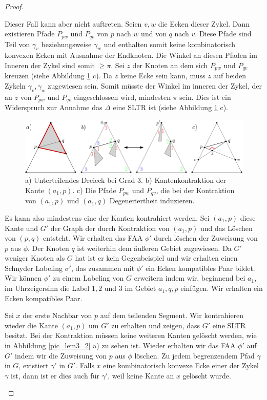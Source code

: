 \begin{proof}
\begin{description}[leftmargin =0pt, font = \bfseries]
Dieser Fall kann aber nicht auftreten. Seien $v,w$ die Ecken dieser Zykel. Dann existieren Pfade $P_{pw}$ und $P_{qv}$ von $p$ nach $w$ und von $q$ nach $v$. Diese Pfade sind Teil von $\gamma_v$ beziehungsweise $\gamma_w$ und enthalten somit keine kombinatorisch konvexen Ecken mit Ausnahme der Endknoten. Die Winkel an diesen Pfaden im Inneren der Zykel sind somit $\geq \pi$. Sei $z$ der Knoten an dem sich $P_{pw}$ und $P_{qv}$ kreuzen (siehe Abbildung \ref{pic_lem3_1} c). Da $z$ keine Ecke sein kann, muss $z$ auf beiden Zykeln $\gamma_v,\gamma_w$  zugewiesen sein. Somit müsste der Winkel im inneren der Zykel, der an $z$ von $P_{pw}$ und $P_{qv}$ eingeschlossen wird, mindesten $\pi$ sein. Dies ist ein Widerspruch zur Annahme das $\Delta$ eine SLTR ist (siehe Abbildung \ref{pic_lem3_1} c).

\begin{figure}[h]
	\centering
	  \includegraphics[width=1\textwidth]{lem3_1.png}
    	\caption{a) Unterteilendes Dreieck bei Grad 3. b) Kantenkontraktion der Kante $(a_1,p)$. c) Die Pfade $P_{pw}$ und $P_{qv}$, die bei der Kontraktion von $(a_1,p)$ und $(a_1,q)$ Degeneriertheit induzieren.}
    	\label{pic_lem3_1}
\end{figure}

Es kann also mindestens eine der Kanten kontrahiert werden. Sei $(a_1,p)$ diese Kante und $G'$ der Graph der durch Kontraktion von $(a_1,p)$ und das Löschen von $(p,q)$ entsteht. Wir erhalten das FAA $\phi'$ durch löschen der Zuweisung von $p$ aus $\phi$. Der Knoten $q$ ist weiterhin dem äußeren Gebiet zugewiesen. Da $G'$ weniger Knoten als $G$ hat ist er kein Gegenbeispiel und wir erhalten einen Schnyder Labeling $\sigma'$, das zusammen mit $\phi'$ ein Ecken kompatibles Paar bildet. Wir können $\phi'$ zu einem Labeling von $G$ erweitern indem wir, beginnend bei $a_1$, im Uhrzeigersinn die Label $1,2$ und $3$ im Gebiet $a_1,q,p$ einfügen. Wir erhalten ein Ecken kompatibles Paar.

\item[Fall 2] Sei $x$ der erste Nachbar von $p$ auf dem teilenden Segment. Wir kontrahieren wieder die Kante $(a_1,p)$ um $G'$ zu erhalten und zeigen, dass $G'$ eine SLTR besitzt. Bei der Kontraktion müssen keine weiteren Kanten gelöscht werden, wie in Abbildung \ref{pic_lem3_2} a) zu sehen ist. Wieder erhalten wir das FAA $\phi'$ auf $G'$ indem wir die Zuweisung von $p$ aus $\phi$ löschen. Zu jedem begrenzendem Pfad $\gamma$ in $G$, existiert $\gamma'$ in $G'$. Falls $x$ eine kombinatorisch konvexe Ecke einer der Zykel $\gamma$ ist, dann ist er dies auch für $\gamma'$, weil keine Kante an $x$ gelöscht wurde.


\end{description}
\end{proof}
